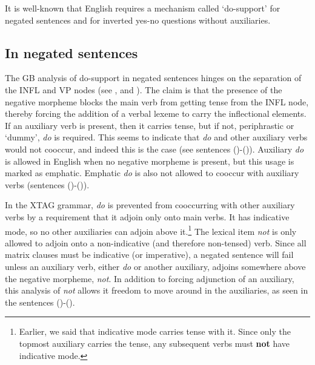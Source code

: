 It is well-known that English requires a mechanism called `do-support' for
negated sentences and for inverted yes-no questions without auxiliaries.


\subsection{In negated sentences}
\label{do-support-negatives}

The GB analysis of do-support in negated sentences hinges on the separation of
the INFL and VP nodes (see \cite{chomsky65}, \cite{jackendoff72} and
\cite{chomsky86}).  The claim is that the presence of the negative morpheme
blocks the main verb from getting tense from the INFL node, thereby forcing the
addition of a verbal lexeme to carry the inflectional elements.  If an
auxiliary verb is present, then it carries tense, but if not, periphrastic or
`dummy', {\it do} is required.  This seems to indicate that {\it do} and other
auxiliary verbs would not cooccur, and indeed this is the case (see sentences
()-()).  Auxiliary {\it do} is allowed in English when no
negative morpheme is present, but this usage is marked as emphatic.  Emphatic
{\it do} is also not allowed to cooccur with auxiliary verbs (sentences
()-()).


In the XTAG grammar, {\it do} is prevented from cooccurring with other
auxiliary verbs by a requirement that it adjoin only onto main verbs.  It has
indicative mode, so no other auxiliaries can adjoin above it.\footnote{Earlier,
we said that indicative mode carries tense with it.  Since only the topmost
auxiliary carries the tense, any subsequent verbs must {\bf not} have
indicative mode.}  The lexical item {\it not} is only allowed to adjoin onto a
non-indicative (and therefore non-tensed) verb.  Since all matrix clauses must
be indicative (or imperative), a negated sentence will fail unless an auxiliary
verb, either {\it do} or another auxiliary, adjoins somewhere above the
negative morpheme, {\it not}. In addition to forcing adjunction of an
auxiliary, this analysis of {\it not} allows it freedom to move around in the
auxiliaries, as seen in the sentences ()-().

